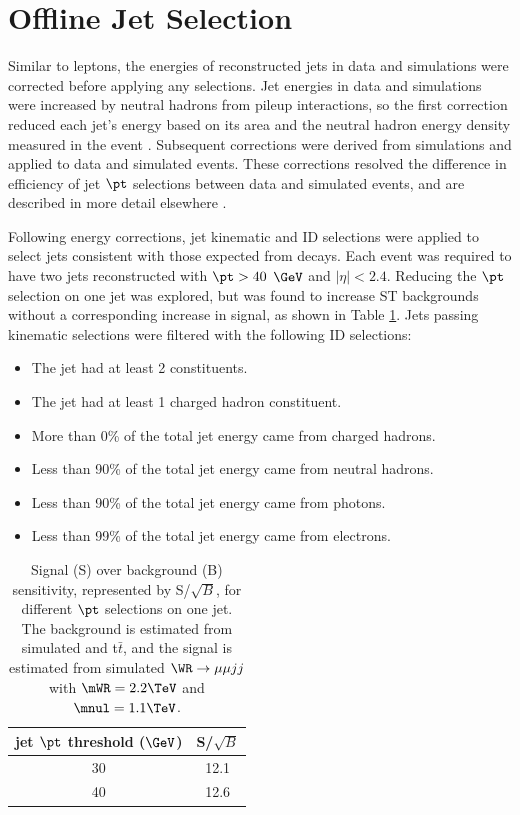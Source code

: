 \section{Offline Jet Selection}
\label{sec:jetSelection}
Similar to leptons, the energies of reconstructed jets in data and simulations were corrected before applying 
any selections.  Jet energies in data and simulations were increased by neutral hadrons from pileup interactions, so 
the first correction reduced each jet's energy based on its area and the neutral hadron energy density measured in the 
event \cite{pileup1,pileup2}.  Subsequent corrections were derived from simulations and applied to data and simulated 
events.  These corrections resolved the difference in efficiency of jet $\pt$ selections between data and simulated 
events, and are described in more detail elsewhere \cite{jetpaper}.

Following energy corrections, jet kinematic and ID selections were applied to select jets consistent 
with those expected from \WR decays.  Each event was required to have two jets reconstructed with $\pt > 40$ $\GeV$ 
and $|\eta| < 2.4$.  Reducing the $\pt$ selection on one jet was explored, but was found to increase ST backgrounds 
without a corresponding increase in \WR signal, as shown in Table \ref{tab:lowerJetPtCuts}.  Jets passing kinematic 
selections were filtered with the following ID selections:

\begin{itemize}
	\item The jet had at least 2 constituents.
	\item The jet had at least 1 charged hadron constituent.
	\item More than 0\% of the total jet energy came from charged hadrons.
	\item Less than 90\% of the total jet energy came from neutral hadrons.
	\item Less than 90\% of the total jet energy came from photons.
	\item Less than 99\% of the total jet energy came from electrons.
\end{itemize}

\begin{table}[h]
	\caption{Signal (S) over background (B) sensitivity, represented by S/$\sqrt{B}$, for different $\pt$ 
	selections on one jet.  The background is estimated from simulated \DY and t$\bar{t}$, and the 
	signal is estimated from simulated $\WR \rightarrow \mu\mu jj$ with $\mWR = 2.2 \TeV$ and $\mnul = 1.1 \TeV$.}
	\label{tab:lowerJetPtCuts}
	\centering
	\begin{tabular}{c|c}
		jet $\pt$ threshold ($\GeV$) & S/$\sqrt{B}$ \\  \hline
		30 &  12.1  \\
		40 &  12.6  \\ \hline
	\end{tabular}
\end{table}

